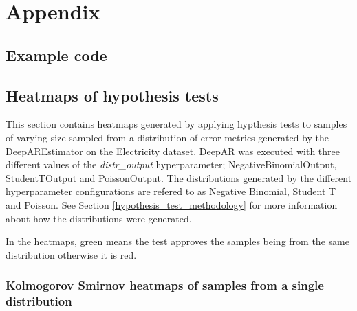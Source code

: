 \chapter{Appendix}
\section{Example code}

\section{Heatmaps of hypothesis tests}
\label{app:heatmaps}

This section contains heatmaps generated by applying hypthesis tests to samples of varying size sampled from a distribution of error metrics generated by the DeepAREstimator on the Electricity dataset. DeepAR was executed with three different values of the \textit{distr\_output} hyperparameter; NegativeBinomialOutput, StudentTOutput and PoissonOutput. The distributions generated by the different hyperparameter configurations are refered to as Negative Binomial, Student T and Poisson. See Section \ref{hypothesis_test_methodology} for more information about how the distributions were generated.

In the heatmaps, green means the test approves the samples being from the same distribution otherwise it is red.


\subsection{Kolmogorov Smirnov heatmaps of samples from a single distribution}

